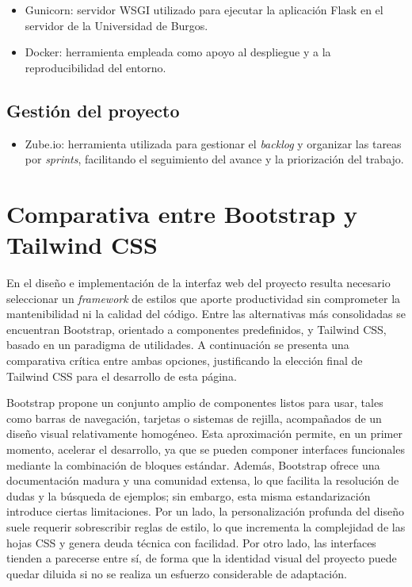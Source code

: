 \begin{itemize}
	\item Gunicorn: servidor WSGI utilizado para ejecutar la aplicación Flask en el servidor de la Universidad de Burgos.
	\item Docker: herramienta empleada como apoyo al despliegue y a la reproducibilidad del entorno.
\end{itemize}

\subsection{Gestión del proyecto}
\begin{itemize}
	\item Zube.io: herramienta utilizada para gestionar el \textit{backlog} y organizar las tareas por \textit{sprints}, facilitando el seguimiento del avance y la priorización del trabajo.
\end{itemize}

\section{Comparativa entre Bootstrap y Tailwind CSS}

En el diseño e implementación de la interfaz web del proyecto resulta necesario seleccionar un \textit{framework} de estilos que aporte productividad sin comprometer la mantenibilidad ni la calidad del código. Entre las alternativas más consolidadas se encuentran Bootstrap, orientado a componentes predefinidos, y Tailwind CSS, basado en un paradigma de utilidades. A continuación se presenta una comparativa crítica entre ambas opciones, justificando la elección final de Tailwind CSS para el desarrollo de esta página.

Bootstrap propone un conjunto amplio de componentes listos para usar, tales como barras de navegación, tarjetas o sistemas de rejilla, acompañados de un diseño visual relativamente homogéneo. Esta aproximación permite, en un primer momento, acelerar el desarrollo, ya que se pueden componer interfaces funcionales mediante la combinación de bloques estándar. Además, Bootstrap ofrece una documentación madura y una comunidad extensa, lo que facilita la resolución de dudas y la búsqueda de ejemplos; sin embargo, esta misma estandarización introduce ciertas limitaciones. Por un lado, la personalización profunda del diseño suele requerir sobrescribir reglas de estilo, lo que incrementa la complejidad de las hojas CSS y genera deuda técnica con facilidad. Por otro lado, las interfaces tienden a parecerse entre sí, de forma que la identidad visual del proyecto puede quedar diluida si no se realiza un esfuerzo considerable de adaptación.

